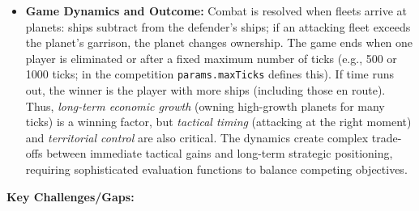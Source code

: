 \documentclass[conference]{IEEEtran}
\begin{document}
\begin{itemize}
\item \textbf{Game Dynamics and Outcome:} Combat is resolved when fleets arrive at planets: ships subtract from the defender's ships; if an attacking fleet exceeds the planet's garrison, the planet changes ownership. The game ends when one player is eliminated or after a fixed maximum number of ticks (e.g., 500 or 1000 ticks; in the competition \texttt{params.maxTicks} defines this). If time runs out, the winner is the player with more ships (including those en route). Thus, \textit{long-term economic growth} (owning high-growth planets for many ticks) is a winning factor, but \textit{tactical timing} (attacking at the right moment) and \textit{territorial control} are also critical. The dynamics create complex trade-offs between immediate tactical gains and long-term strategic positioning, requiring sophisticated evaluation functions to balance competing objectives.
\end{itemize}

\textbf{Key Challenges/Gaps:}
\end{document}
